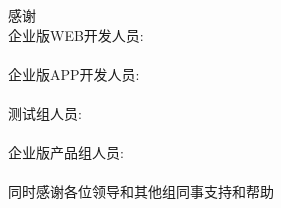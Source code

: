 
\thispagestyle{empty}
\begin{center}
{\Large 感谢}\\[1cm]

 企业版WEB开发人员: \\
{} \\[1cm]

 企业版APP开发人员: \\
{} \\[1cm]

 测试组人员: \\
{} \\[1cm]

 企业版产品组人员: \\
{} \\[1cm]

同时感谢各位领导和其他组同事支持和帮助

\end{center}